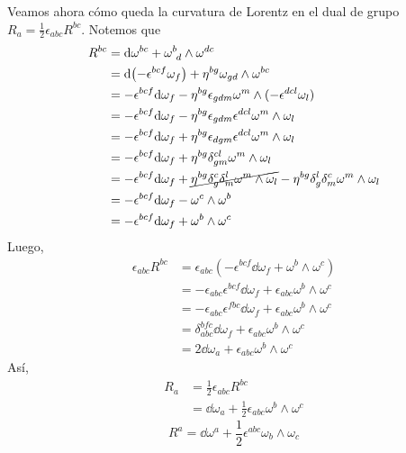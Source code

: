 Veamos ahora cómo queda la curvatura de Lorentz en el dual de grupo $R_{a}=\frac{1}{2}\epsilon_{abc}R^{bc}$. Notemos que
\begin{align}
  R^{bc}&=\dd\omega^{bc}+\omega^b_{~d}\wedge \omega^{dc}\\
  &=\dd (-\epsilon^{bcf}\omega_f)+\eta^{bg}\omega_{gd}\wedge \omega^{bc}\\
  &=-\epsilon^{bcf}\dd\omega_f-\eta^{bg}\epsilon_{gdm}\omega^m\wedge (-\epsilon^{dcl}\omega_l)\\
  &=-\epsilon^{bcf}\dd\omega_f-\eta^{bg}\epsilon_{gdm}\epsilon^{dcl}\omega^m\wedge \omega_l\\
  &=-\epsilon^{bcf}\dd\omega_f+\eta^{bg}\epsilon_{dgm}\epsilon^{dcl}\omega^m\wedge \omega_l\\
  &=-\epsilon^{bcf}\dd\omega_f+\eta^{bg}\delta_{gm}^{cl}\omega^m\wedge\omega_l\\
  &=-\epsilon^{bcf}\dd\omega_f+\cancel{\eta^{bg}\delta_g^c\delta_m^l\omega^m\wedge \omega_l}-\eta^{bg}\delta_g^l\delta_m^c\omega^m\wedge\omega_l\\
  &=-\epsilon^{bcf}\dd\omega_f-\omega^c\wedge\omega^b\\
  &=-\epsilon^{bcf}\dd\omega_f+\omega^b\wedge\omega^c
\end{align}
Luego,
\begin{align}
  \epsilon_{abc}R^{bc}&=\epsilon_{abc}\left(-\epsilon^{bcf}\dd\omega_f+\omega^b\wedge\omega^c\right)\\
  &=-\epsilon_{abc}\epsilon^{bcf}\dd\omega_f+\epsilon_{abc}\omega^b\wedge \omega^c\\
  &=-\epsilon_{abc}\epsilon^{fbc}\dd\omega_f+\epsilon_{abc}\omega^b\wedge \omega^c\\
  &=\delta_{abc}^{bfc}\dd\omega_f+\epsilon_{abc}\omega^b\wedge\omega^c\\
  &=2\dd\omega_a+\epsilon_{abc}\omega^b\wedge\omega^c
\end{align}
Así,
\begin{align}
    R_{a}&=\frac{1}{2}\epsilon_{abc}R^{bc}\\
    &=\dd\omega_a+\frac{1}{2}\epsilon_{abc}\omega^b\wedge \omega^c
\end{align}
\begin{equation}
\boxed{R^{a}=\dd\omega^{a}+\frac{1}{2}\epsilon^{abc}\omega_b\wedge \omega_c}
\end{equation}

